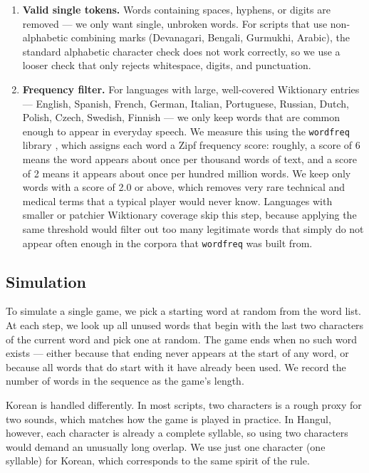 \begin{enumerate}
    \item \textbf{Valid single tokens.} Words containing spaces, hyphens, or digits are removed — we only want single, unbroken words.
    For scripts that use non-alphabetic combining marks (Devanagari, Bengali, Gurmukhi, Arabic), the standard alphabetic character check does not work correctly, so we use a looser check that only rejects whitespace, digits, and punctuation.

    \item \textbf{Frequency filter.} For languages with large, well-covered Wiktionary entries — English, Spanish, French, German, Italian, Portuguese, Russian, Dutch, Polish, Czech, Swedish, Finnish — we only keep words that are common enough to appear in everyday speech.
    We measure this using the \texttt{wordfreq} library \cite{wordfreq}, which assigns each word a Zipf frequency score: roughly, a score of 6 means the word appears about once per thousand words of text, and a score of 2 means it appears about once per hundred million words.
    We keep only words with a score of 2.0 or above, which removes very rare technical and medical terms that a typical player would never know.
    Languages with smaller or patchier Wiktionary coverage skip this step, because applying the same threshold would filter out too many legitimate words that simply do not appear often enough in the corpora that \texttt{wordfreq} was built from.
\end{enumerate}

\subsection{Simulation}

To simulate a single game, we pick a starting word at random from the word list.
At each step, we look up all unused words that begin with the last two characters of the current word and pick one at random.
The game ends when no such word exists — either because that ending never appears at the start of any word, or because all words that do start with it have already been used.
We record the number of words in the sequence as the game's length.

Korean is handled differently.
In most scripts, two characters is a rough proxy for two sounds, which matches how the game is played in practice.
In Hangul, however, each character is already a complete syllable, so using two characters would demand an unusually long overlap.
We use just one character (one syllable) for Korean, which corresponds to the same spirit of the rule.

